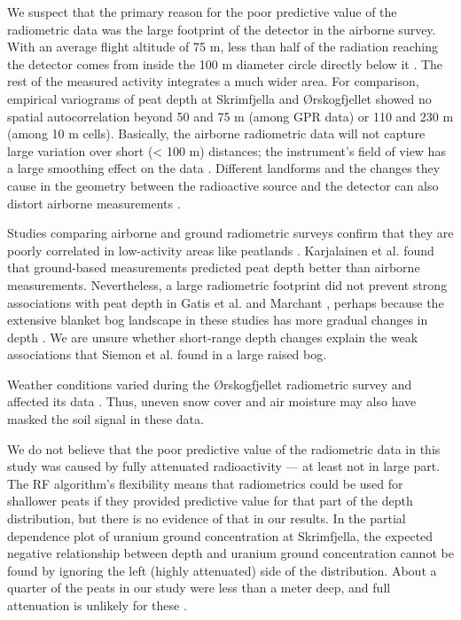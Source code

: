 \documentclass[soil, manuscript]{copernicus}
\begin{document}
We suspect that the primary reason for the poor predictive value of the radiometric data was the large footprint of the detector in the airborne survey.
With an average flight altitude of 75 m, less than half of the radiation reaching the detector comes from inside the 100 m diameter circle directly below it \citep{beamishEnhancingResolutionAirborne2016, beamishDetailedMappingPeat2024}.
The rest of the measured activity integrates a much wider area.
For comparison, empirical variograms of peat depth at Skrimfjella and Ørskogfjellet showed no spatial autocorrelation beyond 50 and 75 m (among GPR data) or 110 and 230 m (among 10 m cells).
Basically, the airborne radiometric data will not capture large variation over short (\textless{} 100 m) distances; the instrument's field of view has a large smoothing effect on the data \citep{beamishEnhancingResolutionAirborne2016, reinhardtGammaraySpectrometryVersatile2019}.
Different landforms and the changes they cause in the geometry between the radioactive source and the detector can also distort airborne measurements \citep{reinhardtGammaraySpectrometryVersatile2019}.

Studies comparing airborne and ground radiometric surveys confirm that they are poorly correlated in low-activity areas like peatlands \citep{kockComparisonAirborneTerrestrial2011, karjalainenComparisonTwoGammaray2025}.
Karjalainen et al. \citeyearpar{karjalainenComparisonTwoGammaray2025} found that ground-based measurements predicted peat depth better than airborne measurements.
Nevertheless, a large radiometric footprint did not prevent strong associations with peat depth in Gatis et al. \citeyearpar{gatisMappingUplandPeat2019} and Marchant \citeyearpar{marchantUsingRemoteSensors2021}, perhaps because the extensive blanket bog landscape in these studies has more gradual changes in depth \citep{lindsayBogsEcologyClassification1995}.
We are unsure whether short-range depth changes explain the weak associations that Siemon et al. \citeyearpar{siemonAirborneElectromagneticRadiometric2020} found in a large raised bog.

Weather conditions varied during the Ørskogfjellet radiometric survey and affected its data \citep{ofstadHelicopterborneMagneticRadiometric2015}.
Thus, uneven snow cover and air moisture may also have masked the soil signal in these data.

We do not believe that the poor predictive value of the radiometric data in this study was caused by fully attenuated radioactivity --- at least not in large part.
The RF algorithm's flexibility means that radiometrics could be used for shallower peats if they provided predictive value for that part of the depth distribution, but there is no evidence of that in our results.
In the partial dependence plot of uranium ground concentration at Skrimfjella, the expected negative relationship between depth and uranium ground concentration cannot be found by ignoring the left (highly attenuated) side of the distribution.
About a quarter of the peats in our study were less than a meter deep, and full attenuation is unlikely for these \citep{beamishGammaRayAttenuation2013}.
\end{document}
